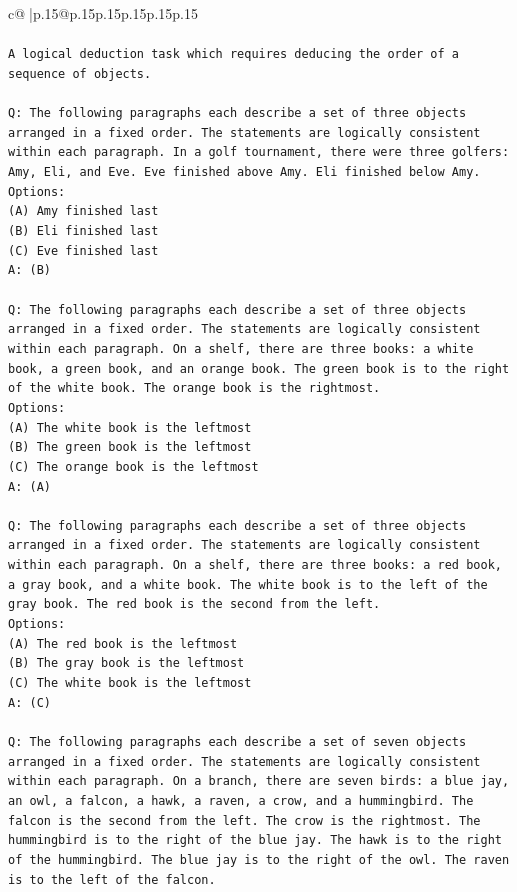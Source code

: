 \documentclass{article}
\begin{document}
{\begin{supertabular}{c@{$\;$}|p{.15\linewidth}@{}p{.15\linewidth}p{.15\linewidth}p{.15\linewidth}p{.15\linewidth}p{.15\linewidth}}
{{{\\ 
\\ 
\texttt{A logical deduction task which requires deducing the order of a sequence of objects.} \\
\\ 
\texttt{Q: The following paragraphs each describe a set of three objects arranged in a fixed order. The statements are logically consistent within each paragraph. In a golf tournament, there were three golfers: Amy, Eli, and Eve. Eve finished above Amy. Eli finished below Amy.} \\
\texttt{Options:} \\
\texttt{(A) Amy finished last} \\
\texttt{(B) Eli finished last} \\
\texttt{(C) Eve finished last} \\
\texttt{A: (B)} \\
\\ 
\texttt{Q: The following paragraphs each describe a set of three objects arranged in a fixed order. The statements are logically consistent within each paragraph. On a shelf, there are three books: a white book, a green book, and an orange book. The green book is to the right of the white book. The orange book is the rightmost.} \\
\texttt{Options:} \\
\texttt{(A) The white book is the leftmost} \\
\texttt{(B) The green book is the leftmost} \\
\texttt{(C) The orange book is the leftmost} \\
\texttt{A: (A)} \\
\\ 
\texttt{Q: The following paragraphs each describe a set of three objects arranged in a fixed order. The statements are logically consistent within each paragraph. On a shelf, there are three books: a red book, a gray book, and a white book. The white book is to the left of the gray book. The red book is the second from the left.} \\
\texttt{Options:} \\
\texttt{(A) The red book is the leftmost} \\
\texttt{(B) The gray book is the leftmost} \\
\texttt{(C) The white book is the leftmost} \\
\texttt{A: (C)} \\
\\ 
\texttt{Q: The following paragraphs each describe a set of seven objects arranged in a fixed order. The statements are logically consistent within each paragraph. On a branch, there are seven birds: a blue jay, an owl, a falcon, a hawk, a raven, a crow, and a hummingbird. The falcon is the second from the left. The crow is the rightmost. The hummingbird is to the right of the blue jay. The hawk is to the right of the hummingbird. The blue jay is to the right of the owl. The raven is to the left of the falcon.} \\
}}}
\end{supertabular}}
\end{document}

